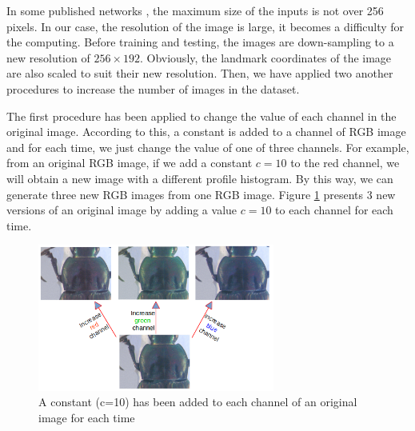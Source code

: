 \documentclass{article} %
\begin{document}
\begin{multicols}{2}
In some published networks \cite{krizhevsky2012imagenet, sun2013deep, cintas2016automatic}, the maximum size of the inputs is not over 256 pixels. In our case, the resolution of the image is large, it becomes a difficulty for the computing. Before training and testing, the images are down-sampling to a new resolution of $256 \times 192$. Obviously, the landmark coordinates of the image are also scaled to suit their new resolution. Then, we have applied two another procedures to increase the number of images in the dataset.


The first procedure has been applied to change the value of each channel in the original image. According to this, a constant is added to a channel of RGB image and for each time, we just change the value of one of three channels. For example, from an original RGB image, if we add a constant $c = 10$ to the red channel, we will obtain a new image with a different profile histogram. By this way, we can generate three new RGB images from one RGB image. Figure \ref{figpronotum} presents $3$ new versions of an original image by adding a value $c = 10$ to each channel for each time.

\begin{figure}[H]
	\centerline{\includegraphics[height=1.9in]{images/inc_channels.png}}
	\caption{\footnotesize{A constant (c=10) has been added to each channel of an original image for each time}}
	\label{figpronotum}
\end{figure}


\end{multicols}
\end{document}
